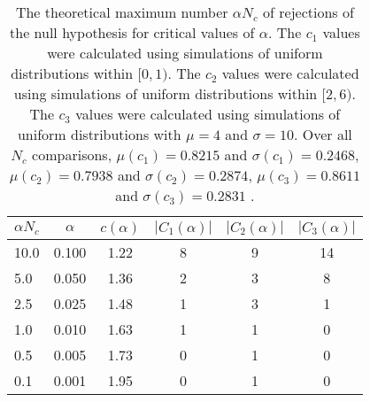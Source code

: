\begin{table}[h!]
\begin{center}
\begin{tabular}{| l | c | c | c | c | c |}\hline
$\alpha N_c$ & $\alpha$ & $c(\alpha)$ & $|C_1(\alpha)|$ & $|C_2(\alpha)|$ & $|C_3(\alpha)|$ \\\hline
10.0 & 0.100 & 1.22 & 8 & 9 & 14 \\\hline
5.0 & 0.050 & 1.36 & 2 & 3 & 8 \\\hline
2.5 & 0.025 & 1.48 & 1 & 3 & 1 \\\hline
1.0 & 0.010 & 1.63 & 1 & 1 & 0 \\\hline
0.5 & 0.005 & 1.73 & 0 & 1 & 0 \\\hline
0.1 & 0.001 & 1.95 & 0 & 1 & 0 \\\hline
\end{tabular}
\caption{The theoretical maximum number $\alpha N_c$ of rejections
        of the null hypothesis for critical values of $\alpha$.
        The $c_1$ values were calculated using simulations of uniform distributions within $[0,1)$.
        The $c_2$ values were calculated using simulations of uniform distributions within $[2,6)$.
        The $c_3$ values were calculated using simulations of uniform distributions with $\mu=4$ and $\sigma=10$.
        Over all $N_c$ comparisons,
         $\mu(c_1)=0.8215$ and $\sigma(c_1)=0.2468$,
         $\mu(c_2)=0.7938$ and $\sigma(c_2)=0.2874$,
         $\mu(c_3)=0.8611$ and $\sigma(c_3)=0.2831$ .
        }
\end{center}
\end{table}